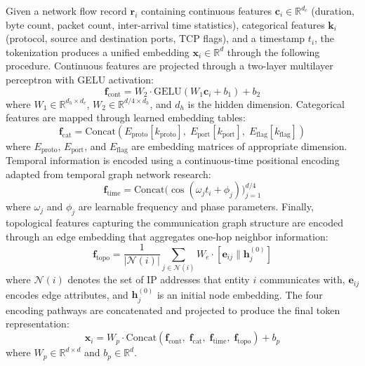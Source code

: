 \documentclass[journal]{IEEEtran}
\newcommand{\RR}{\mathbb{R}}
\begin{document}
Given a network flow record $\mathbf{r}_i$ containing continuous features $\mathbf{c}_i \in \RR^{d_c}$ (duration, byte count, packet count, inter-arrival time statistics), categorical features $\mathbf{k}_i$ (protocol, source and destination ports, TCP flags), and a timestamp $t_i$, the tokenization produces a unified embedding $\mathbf{x}_i \in \RR^{d}$ through the following procedure. Continuous features are projected through a two-layer multilayer perceptron with GELU activation:
\begin{equation}
\mathbf{f}_{\text{cont}} = W_2 \cdot \text{GELU}(W_1 \mathbf{c}_i + b_1) + b_2
\label{eq:cont_enc}
\end{equation}
where $W_1 \in \RR^{d_h \times d_c}$, $W_2 \in \RR^{d/4 \times d_h}$, and $d_h$ is the hidden dimension. Categorical features are mapped through learned embedding tables:
\begin{equation}
\mathbf{f}_{\text{cat}} = \text{Concat}(E_{\text{proto}}[k_{\text{proto}}],\; E_{\text{port}}[k_{\text{port}}],\; E_{\text{flag}}[k_{\text{flag}}])
\label{eq:cat_enc}
\end{equation}
where $E_{\text{proto}}$, $E_{\text{port}}$, and $E_{\text{flag}}$ are embedding matrices of appropriate dimension. Temporal information is encoded using a continuous-time positional encoding adapted from temporal graph network research:
\begin{equation}
\mathbf{f}_{\text{time}} = \text{Concat}\bigl(\cos(\omega_j t_i + \phi_j)\bigr)_{j=1}^{d/4}
\label{eq:time_enc}
\end{equation}
where $\omega_j$ and $\phi_j$ are learnable frequency and phase parameters. Finally, topological features capturing the communication graph structure are encoded through an edge embedding that aggregates one-hop neighbor information:
\begin{equation}
\mathbf{f}_{\text{topo}} = \frac{1}{|\mathcal{N}(i)|}\sum_{j \in \mathcal{N}(i)} W_e \cdot [\mathbf{e}_{ij} \| \mathbf{h}_j^{(0)}]
\label{eq:topo_enc}
\end{equation}
where $\mathcal{N}(i)$ denotes the set of IP addresses that entity $i$ communicates with, $\mathbf{e}_{ij}$ encodes edge attributes, and $\mathbf{h}_j^{(0)}$ is an initial node embedding. The four encoding pathways are concatenated and projected to produce the final token representation:
\begin{equation}
\mathbf{x}_i = W_p \cdot \text{Concat}(\mathbf{f}_{\text{cont}},\; \mathbf{f}_{\text{cat}},\; \mathbf{f}_{\text{time}},\; \mathbf{f}_{\text{topo}}) + b_p
\label{eq:final_token}
\end{equation}
where $W_p \in \RR^{d \times d}$ and $b_p \in \RR^{d}$.
\end{document}
